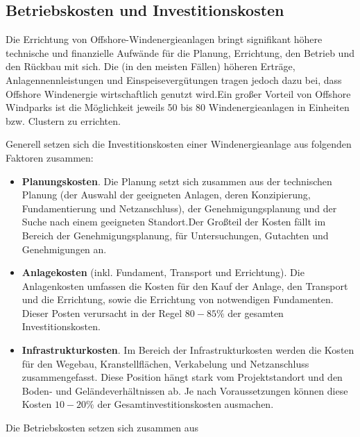 \documentclass[a4paper,12pt]{article}
\begin{document}
	\subsection{Betriebskosten und Investitionskosten}
	Die Errichtung von Offshore-Windenergieanlagen bringt signifikant höhere technische und finanzielle Aufwände für die Planung, Errichtung, den Betrieb und den Rückbau mit sich. Die (in den meisten Fällen) höheren Erträge, Anlagennennleistungen und Einspeisevergütungen tragen jedoch dazu bei, dass Offshore Windenergie wirtschaftlich genutzt wird.\newline Ein großer Vorteil von Offshore Windparks ist die Möglichkeit jeweils 50 bis 80 Windenergieanlagen in Einheiten bzw. Clustern zu errichten.\\ \par
	\noindent Generell setzen sich die Investitionskosten einer Windenergieanlage aus folgenden Faktoren zusammen:
	\begin{itemize}
		\item \textbf{Planungskosten}. Die Planung setzt sich zusammen aus der technischen Planung (der Auswahl der geeigneten Anlagen, deren Konzipierung, Fundamentierung und Netzanschluss), der Genehmigungsplanung und der Suche nach einem geeigneten Standort.\newline Der Großteil der Kosten fällt im Bereich der Genehmigungsplanung, für Untersuchungen, Gutachten und Genehmigungen an.
		\item \textbf{Anlagekosten} (inkl. Fundament, Transport und Errichtung). Die Anlagenkosten umfassen die Kosten für den Kauf der Anlage, den Transport und die Errichtung, sowie die Errichtung von notwendigen Fundamenten.\newline
		Dieser Posten verursacht in der Regel $80 - 85\%$ der gesamten Investitionskosten.
		\item \textbf{Infrastrukturkosten}. Im Bereich der Infrastrukturkosten werden die Kosten für den Wegebau, Kranstellflächen, Verkabelung und Netzanschluss zusammengefasst. Diese Position hängt stark vom Projektstandort und den Boden- und Geländeverhältnissen ab.\newline
		Je nach Voraussetzungen können diese Kosten $10 - 20\%$ der Gesamtinvestitionskosten ausmachen.
	\end{itemize}
	Die Betriebskosten setzen sich zusammen aus
\end{document}
